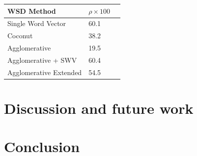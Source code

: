 \documentclass[11pt]{article}
\begin{document}
\begin{table}[H]
    \begin{tabular}{|l|l|l|}
    \hline
    WSD Method & $\rho \times 100$ \\ \hline
    Single Word Vector & 60.1 \\ \hline
    Coconut & 38.2 \\ \hline
    Agglomerative & 19.5 \\ \hline
    Agglomerative + SWV & 60.4 \\ \hline
    Agglomerative Extended & 54.5 \\ \hline
    \end{tabular}
\end{table}



\section{Discussion and future work}
\section{Conclusion}



\end{document}
